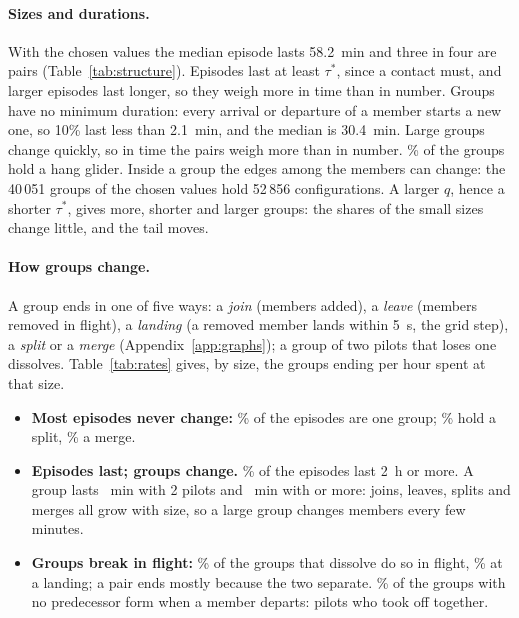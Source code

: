 \paragraph{Sizes and durations.} With the chosen values the median episode lasts 58.2~min and three
in four are pairs (Table~\ref{tab:structure}). Episodes last at least $\tau^*$, since a contact
must, and larger episodes last longer, so they weigh more in time than in number. Groups have no
minimum duration: every arrival or departure of a member starts a new one, so 10\% last less
than 2.1~min, and the median is 30.4~min. Large groups change quickly, so in time the pairs weigh
more than in number. \StWithHang\% of the groups hold a hang glider. Inside a group the edges
among the members can change: the 40\,051 groups of the chosen values hold 52\,856
configurations. A larger $q$, hence a shorter $\tau^*$, gives more, shorter and larger groups:
the shares of the small sizes change little, and the tail moves.

\paragraph{How groups change.}\label{sec:describe} A group ends in one of five ways: a
\emph{join} (members added), a \emph{leave} (members removed in flight), a \emph{landing} (a
removed member lands within 5~s, the grid step), a \emph{split} or a \emph{merge}
(Appendix~\ref{app:graphs}); a group of two pilots that loses one dissolves.
Table~\ref{tab:rates} gives, by size, the groups ending per hour spent at that size.
\begin{itemize}
  \item \textbf{Most episodes never change:} \StEpisodeSingle\% of the \StEpisodes{} episodes are one
        group; \StEpisodeSplit\% hold a split, \StEpisodeMerge\% a merge.
  \item \textbf{Episodes last; groups change.} \StEpisodeTwoHours\% of the episodes last 2~h or
        more. A group lasts \StMedianGroupTwo~min with 2 pilots and \StMedianGroupMax~min with
        \StSizeMax{} or more: joins, leaves, splits and merges all grow with size, so a large group
        changes members every few minutes.
  \item \textbf{Groups break in flight:} \StEndFlight\% of the \StEnds{} groups that dissolve do
        so in flight, \StEndLanding\% at a landing; a pair ends mostly because the two separate.
        \StFormDeparture\% of the \StFormations{} groups with no predecessor form when a member
        departs: pilots who took off together.
\end{itemize}

